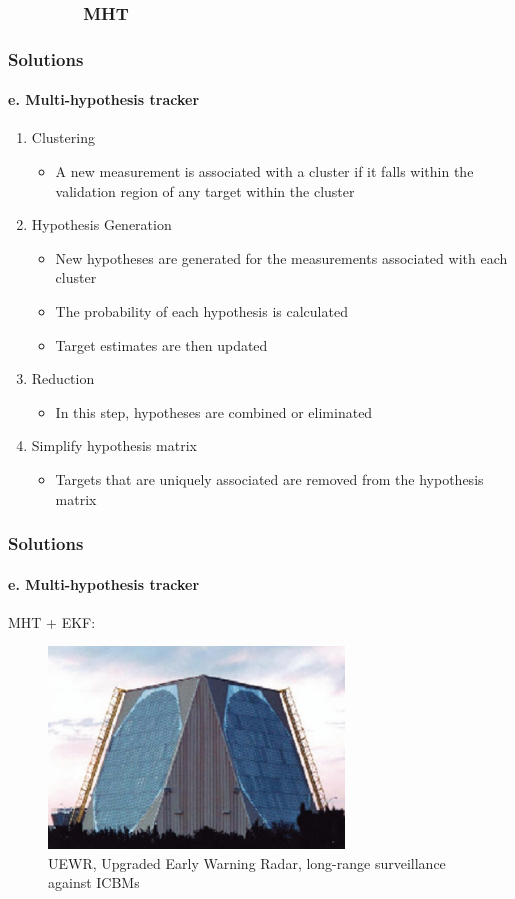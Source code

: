 \documentclass{beamer}
\begin{document}
\subsubsection{\ \ \ \ \ \ \ \ MHT }
\begin{frame}
\frametitle{Solutions}
\framesubtitle{e. Multi-hypothesis tracker}
\mypagenum
	\begin{enumerate}
	\item {\color{red}Clustering}
		\begin{itemize}
			\item A new measurement is associated with a cluster if it falls within the validation region of any target within the cluster
		\end{itemize}
	\item {\color{red}Hypothesis Generation}
		\begin{itemize} 
			\item New hypotheses are generated for the measurements associated with each cluster
			\item The probability of each hypothesis is calculated
			\item Target estimates are then updated
		\end{itemize}
	\item {\color{red}Reduction}
		\begin{itemize}
			\item In this step, hypotheses are combined or eliminated
		\end{itemize}
	\item {\color{red}Simplify hypothesis matrix}
		\begin{itemize}
			\item Targets that are uniquely associated are removed from the hypothesis matrix
		\end{itemize}
	\end{enumerate}
\end{frame}




\begin{frame}
\frametitle{Solutions}
\framesubtitle{e. Multi-hypothesis tracker}
\mypagenum
	MHT + EKF:
	\begin{figure}
		\includegraphics[width=0.7\textwidth]{figs/TRK_MHT_example_UEWR.jpg}
		\caption {UEWR, Upgraded Early Warning Radar, long-range surveillance against ICBMs}
	\end{figure}
\end{frame}
\end{document}
